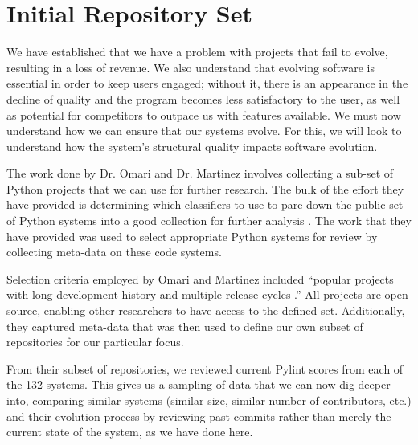 \section{Initial Repository Set} \label{sectionInitialSet}

We have established that we have a problem with projects that fail to evolve, resulting in a loss of revenue. We also understand that evolving software is essential in order to keep users engaged; without it, there is an appearance in the decline of quality and the program becomes less satisfactory to the user, as well as potential for competitors to outpace us with features available. We must now understand how we can ensure that our systems evolve. For this, we will look to understand how the system's structural quality impacts software evolution.

The work done by Dr. Omari and Dr. Martinez involves collecting a sub-set of Python projects that we can use for further research. The bulk of the effort they have provided is determining which classifiers to use to pare down the public set of Python systems into a good collection for further analysis \cite{omari:2018}. The work that they have provided was used to select appropriate Python systems for review by collecting meta-data on these code systems.

Selection criteria employed by Omari and Martinez included ``popular projects with long development history and multiple release cycles \cite{omari:2018}.'' All projects are open source, enabling other researchers to have access to the defined set. Additionally, they captured meta-data that was then used to define our own subset of repositories for our particular focus.

From their subset of repositories, we reviewed current Pylint scores from each of the 132 systems. This gives us a sampling of data that we can now dig deeper into, comparing similar systems (similar size, similar number of contributors, etc.) and their evolution process by reviewing past commits rather than merely the current state of the system, as we have done here.
